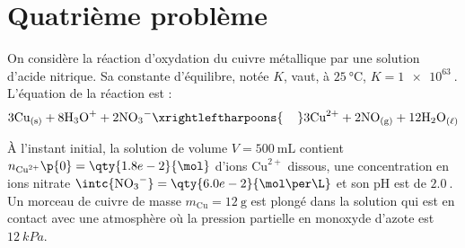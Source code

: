 \documentclass[a4paper,french,bookmarks]{article}
\begin{document}
\begin{enumerate}
        \noafter
        \nobefore
        \yesafter
    \end{enumerate}
    
    \newpage
    
    \section{Quatrième problème}
    
    On considère la réaction d'oxydation du cuivre métallique par une solution d'acide nitrique. Sa constante d'équilibre, notée $K$, vaut, à $\qty{25}{\celsius}$, $K = \qty{1e63}{}$. L'équation de la réaction est :
    \[ 3{\text{Cu}}_\text{(s)} + 8{\text H_3\text O}^+ + 2{\text N\text O_3}^- \xrightleftharpoons{\hspace{0.4cm}} 3{\text{Cu}}^{2+} + 2{\text{NO}}_\text{(g)} + 12{\text H_2 \text O}_\text{($\ell$)}\]
        
    À l'instant initial, la solution de volume $V = \qty{500}{\mL}$ contient $n_{\text{Cu}^{2+}}\p{0} = \qty{1.8e-2}{\mol}$ d'ions $\text{Cu}^{2+}$ dissous, une concentration en ions nitrate $\intc{{\text{NO}_3}^-} = \qty{6.0e-2}{\mol \per \L}$ et son pH est de $\qty{2,0}{}$. Un morceau de cuivre de masse $m_\text{Cu} = \qty{12}{\g}$ est plongé dans la solution qui est en contact avec une atmosphère où la pression partielle en monoxyde d'azote est $\qty{12}{kPa}$.
        
\end{document}
